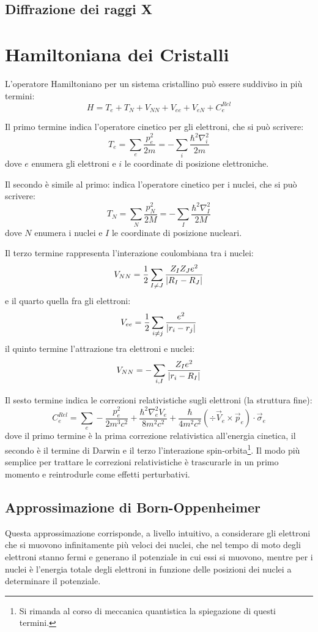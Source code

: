 \subsection{Diffrazione dei raggi X}

\section{Hamiltoniana dei Cristalli}

L'operatore Hamiltoniano per un sistema cristallino può essere suddiviso in più termini:
\[ H = T_e + T_N + V_{NN} + V_{ee} + V_{eN} + C_e^{Rel} \]

Il primo termine indica l'operatore cinetico per gli elettroni, che si può scrivere:
\[ T_e = \sum_e \frac{p_e^2}{2m} = - \sum_i \frac{\hbar^2\nabla_i^2}{2m}\]
dove $ e $ enumera gli elettroni e $ i $ le coordinate di posizione elettroniche.

Il secondo è simile al primo: indica l'operatore cinetico per i nuclei, che si può scrivere:
\[ T_N = \sum_N \frac{p_N^2}{2M} = - \sum_I \frac{\hbar^2\nabla_I^2}{2M}\]
dove $ N $ enumera i nuclei e $ I $ le coordinate di posizione nucleari.

Il terzo termine rappresenta l'interazione coulombiana tra i nuclei:
\[ V_{NN} = \frac{1}{2} \sum_{I \neq J} \frac{Z_I Z_J e^2}{\abs{R_I - R_J}}\]
e il quarto quella fra gli elettroni:
\[ V_{ee} = \frac{1}{2} \sum_{i \neq j} \frac{e^2}{\abs{r_i - r_j}}\]
il quinto termine l'attrazione tra elettroni e nuclei:
\[ V_{NN} = - \sum_{i,I} \frac{Z_I e^2}{\abs{r_i - R_I}}\]

Il sesto termine indica le correzioni relativistiche sugli elettroni (la struttura fine):
\[ C_e^{Rel} = \sum_e - \frac{p_e^2}{2 m^3 c^2} + \frac{\hbar^2\nabla_e^2 V_e}{8 m^2 c^2} + \frac{\hbar}{4 m^2 c^2}(\div{\vec{V}_e} \times \vec{p}_e)\cdot \vec{\sigma}_e\]
dove il primo termine è la prima correzione relativistica all'energia cinetica, il secondo è il termine di Darwin e il terzo l'interazione spin-orbita\footnote{Si rimanda al corso di meccanica quantistica la spiegazione di questi termini.}.
Il modo più semplice per trattare le correzioni relativistiche è trascurarle in un primo momento e reintrodurle come effetti perturbativi.

\subsection{Approssimazione di Born-Oppenheimer}

Questa approssimazione corrisponde, a livello intuitivo, a considerare gli elettroni che si muovono infinitamente più veloci dei nuclei, che nel tempo di moto degli elettroni stanno fermi e generano il potenziale in cui essi si muovono, mentre per i nuclei è l'energia totale degli elettroni in funzione delle posizioni dei nuclei a determinare il potenziale.

